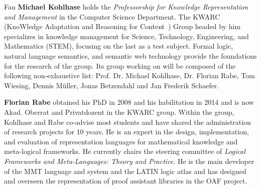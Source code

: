 \begin{sitedescription}{Fau}
\textbf{Michael Kohlhase} holds the \emph{Professorship for Knowledge Representation and Management} in the Computer Science Department.
The KWARC (KnoWledge Adaptation and Reasoning for Content~\cite{KWARC:online}) Group headed by him specializes in knowledge management for Science, Technology, Engineering, and Mathematics (STEM), focusing on the last as a test subject.
Formal logic, natural language semantics, and semantic web technology provide the foundations for the research of the group.
Its group working on \pn will be composed of the following non-exhaustive list: Prof. Dr. Michael Kohlhase, Dr. Florian Rabe, Tom Wiesing, Dennis M\"uller, Jonas Betzendahl and Jan Frederik Schaefer.

\textbf{Florian Rabe} obtained his PhD in 2008 and his habilitation in 2014 and is now Akad. Oberrat and Privatdozent in the KWARC group.
Within the group, Kohlhase and Rabe co-advise most students and have shared the administration of research projects for 10 years.
He is an expert in the design, implementation, and evaluation of representation languages for mathematical knowledge and meta-logical frameworks.
He currently chairs the steering committee of \emph{Logical Frameworks and Meta-Languages: Theory and Practice}.
He is the main developer of the MMT language and system and the LATIN logic atlas and has designed and overseen the representation of proof assistant libraries in the OAF project.
\end{sitedescription}

